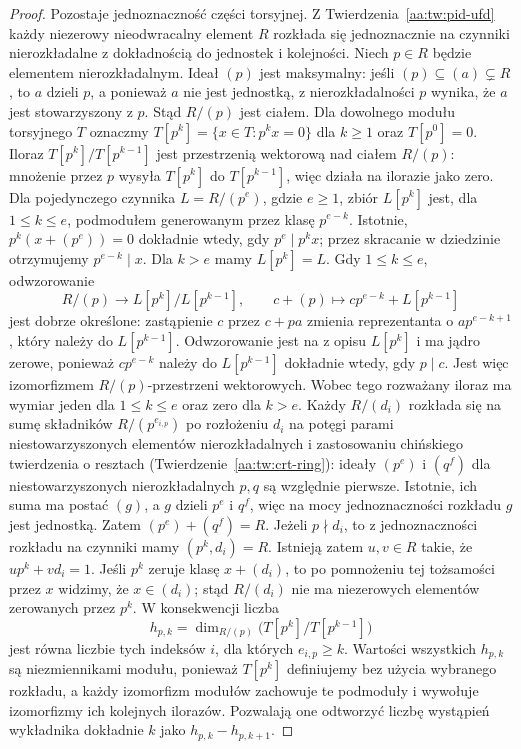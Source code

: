 \begin{proof}
Pozostaje jednoznaczność części torsyjnej. Z
Twierdzenia~\ref{aa:tw:pid-ufd} każdy niezerowy
nieodwracalny element $R$ rozkłada się jednoznacznie
na czynniki nierozkładalne z dokładnością do jednostek
i kolejności. Niech $p\in R$ będzie elementem
nierozkładalnym. Ideał $(p)$ jest maksymalny:
jeśli $(p)\subseteq(a)\subsetneq R$, to $a$ dzieli
$p$, a ponieważ $a$ nie jest jednostką, z nierozkładalności
$p$ wynika, że $a$ jest stowarzyszony z $p$.
Stąd $R/(p)$ jest ciałem.
Dla dowolnego modułu torsyjnego $T$ oznaczmy
$T[p^k]=\{x\in T:p^kx=0\}$ dla $k\ge1$ oraz
$T[p^0]=0$. Iloraz $T[p^k]/T[p^{k-1}]$ jest
przestrzenią wektorową nad ciałem $R/(p)$:
mnożenie przez $p$ wysyła $T[p^k]$ do $T[p^{k-1}]$,
więc działa na ilorazie jako zero.
Dla pojedynczego czynnika $L=R/(p^e)$, gdzie $e\ge1$,
zbiór $L[p^k]$ jest, dla $1\le k\le e$, podmodułem
generowanym przez klasę $p^{e-k}$. Istotnie,
$p^k(x+(p^e))=0$ dokładnie wtedy, gdy $p^e\mid p^kx$;
przez skracanie w dziedzinie otrzymujemy
$p^{e-k}\mid x$. Dla $k>e$ mamy $L[p^k]=L$.
Gdy $1\le k\le e$, odwzorowanie
\[
 R/(p)\longrightarrow L[p^k]/L[p^{k-1}],\qquad
 c+(p)\longmapsto cp^{e-k}+L[p^{k-1}]
\]
jest dobrze określone: zastąpienie $c$ przez $c+pa$
zmienia reprezentanta o $ap^{e-k+1}$, który należy do
$L[p^{k-1}]$. Odwzorowanie jest na z opisu $L[p^k]$
i ma jądro zerowe, ponieważ $cp^{e-k}$ należy do
$L[p^{k-1}]$ dokładnie wtedy, gdy $p\mid c$.
Jest więc izomorfizmem $R/(p)$-przestrzeni wektorowych.
Wobec tego rozważany iloraz ma wymiar jeden dla
$1\le k\le e$ oraz zero dla $k>e$.
Każdy $R/(d_i)$ rozkłada się na sumę składników
$R/(p^{e_{i,p}})$ po rozłożeniu $d_i$ na potęgi
parami niestowarzyszonych elementów nierozkładalnych
i zastosowaniu chińskiego twierdzenia o resztach
(Twierdzenie~\ref{aa:tw:crt-ring}): ideały
$(p^e)$ i $(q^f)$ dla niestowarzyszonych
nierozkładalnych $p,q$ są względnie pierwsze.
Istotnie, ich suma ma postać $(g)$, a $g$ dzieli
$p^e$ i $q^f$, więc na mocy jednoznaczności
rozkładu $g$ jest jednostką. Zatem
$(p^e)+(q^f)=R$. Jeżeli $p\nmid d_i$, to z jednoznaczności rozkładu na
czynniki mamy $(p^k,d_i)=R$. Istnieją zatem $u,v\in R$
takie, że $up^k+vd_i=1$. Jeśli $p^k$ zeruje klasę
$x+(d_i)$, to po pomnożeniu tej tożsamości przez $x$
widzimy, że $x\in(d_i)$; stąd $R/(d_i)$ nie ma
niezerowych elementów zerowanych przez $p^k$.
W konsekwencji liczba
\[
 h_{p,k}=\dim_{R/(p)}\bigl(T[p^k]/T[p^{k-1}]\bigr)
\]
jest równa liczbie tych indeksów $i$, dla których
$e_{i,p}\ge k$. Wartości wszystkich $h_{p,k}$ są
niezmiennikami modułu, ponieważ $T[p^k]$ definiujemy
bez użycia wybranego rozkładu, a każdy izomorfizm
modułów zachowuje te podmoduły i wywołuje izomorfizmy
ich kolejnych ilorazów. Pozwalają one odtworzyć liczbę
wystąpień wykładnika dokładnie $k$ jako
$h_{p,k}-h_{p,k+1}$.


\end{proof}
